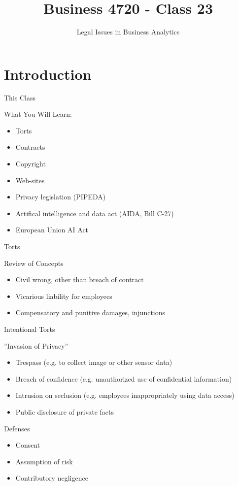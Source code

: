 \documentclass[ignorenonframetext,xcolor=x11names]{beamer}
\title{Business 4720 - Class 23}
\subtitle{Legal Issues in Business Analytics}
\begin{document}
\begin{frame}[label=full]{}
  \titlepage
  \footnotesize
  
\end{frame}

\section{Introduction}

\begin{frame}[label=full]{This Class}
\begin{block}{What You Will Learn:}
\begin{itemize}
  \item Torts 
  \item Contracts 
  \item Copyright 
  \item Web-sites 
  \item Privacy legislation (PIPEDA)
  \item Artifical intelligence and data act (AIDA, Bill C-27)
  \item European Union AI Act
\end{itemize}
\end{block}
\end{frame}

\begin{frame}[label=full]{Torts}
\begin{block}{Review of Concepts}
  \begin{itemize}
     \item Civil wrong, other than breach of contract
     \item Vicarious liability for employees
     \item Compensatory and punitive damages, injunctions
  \end{itemize}
\end{block}
\end{frame}

\begin{frame}[label=full]{Intentional Torts}
\begin{block}{''Invasion of Privacy''}
  \begin{itemize}
     \item Trespass (e.g. to collect image or other sensor data)
     \item Breach of confidence (e.g. unauthorized use of confidential information)
     \item Intrusion on seclusion  (e.g. employees inappropriately using data access)
     \item Public disclosure of private facts
  \end{itemize}
\end{block}  
\begin{block}{Defenses}
  \begin{itemize}
     \item Consent
     \item Assumption of risk
     \item Contributory negligence
  \end{itemize}
\end{block}
\end{frame}
\end{document}
